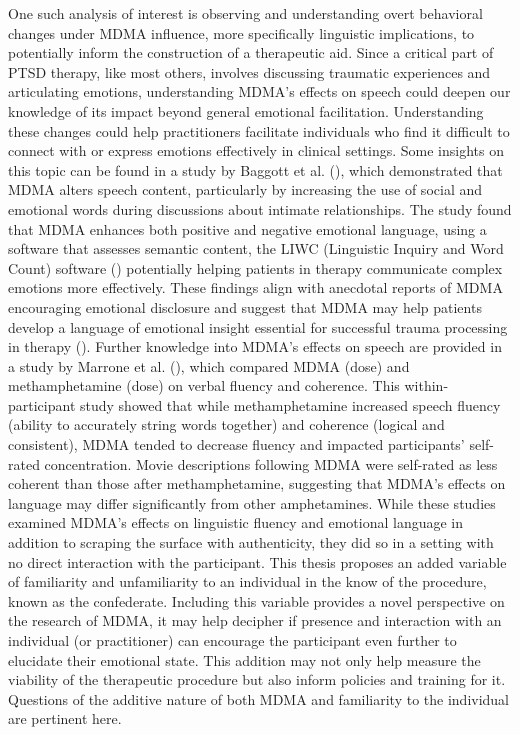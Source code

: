 \documentclass[
  man,
  longtable,
  nolmodern,
  notxfonts,
  notimes,
  colorlinks=true,linkcolor=blue,citecolor=blue,urlcolor=blue]{apa7}
\begin{document}
One such analysis of interest is observing and understanding overt
behavioral changes under MDMA influence, more specifically linguistic
implications, to potentially inform the construction of a therapeutic
aid. Since a critical part of PTSD therapy, like most others, involves
discussing traumatic experiences and articulating emotions,
understanding MDMA's effects on speech could deepen our knowledge of its
impact beyond general emotional facilitation. Understanding these
changes could help practitioners facilitate individuals who find it
difficult to connect with or express emotions effectively in clinical
settings. Some insights on this topic can be found in a study by Baggott
et al. (), which
demonstrated that MDMA alters speech content, particularly by increasing
the use of social and emotional words during discussions about intimate
relationships. The study found that MDMA enhances both positive and
negative emotional language, using a software that assesses semantic
content, the LIWC (Linguistic Inquiry and Word Count) software
()
potentially helping patients in therapy communicate complex emotions
more effectively. These findings align with anecdotal reports of MDMA
encouraging emotional disclosure and suggest that MDMA may help patients
develop a language of emotional insight essential for successful trauma
processing in therapy (). Further knowledge into MDMA's effects on speech are
provided in a study by Marrone et al.
(), which compared MDMA
(dose) and methamphetamine (dose) on verbal fluency and coherence. This
within-participant study showed that while methamphetamine increased
speech fluency (ability to accurately string words together) and
coherence (logical and consistent), MDMA tended to decrease fluency and
impacted participants' self-rated concentration. Movie descriptions
following MDMA were self-rated as less coherent than those after
methamphetamine, suggesting that MDMA's effects on language may differ
significantly from other amphetamines. While these studies examined
MDMA's effects on linguistic fluency and emotional language in addition
to scraping the surface with authenticity, they did so in a setting with
no direct interaction with the participant. This thesis proposes an
added variable of familiarity and unfamiliarity to an individual in the
know of the procedure, known as the confederate. Including this variable
provides a novel perspective on the research of MDMA, it may help
decipher if presence and interaction with an individual (or
practitioner) can encourage the participant even further to elucidate
their emotional state. This addition may not only help measure the
viability of the therapeutic procedure but also inform policies and
training for it. Questions of the additive nature of both MDMA and
familiarity to the individual are pertinent here.
\end{document}

